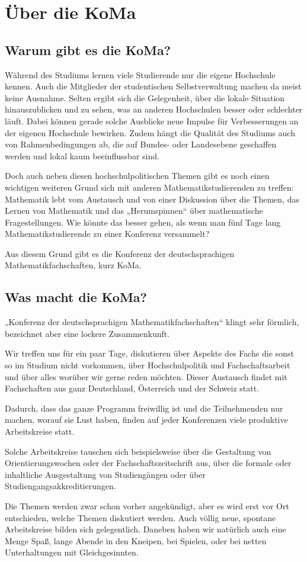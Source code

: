 \chapter{Über die KoMa}

\section{Warum gibt es die KoMa?}

Während des Studiums lernen viele Studierende nur die eigene Hochschule kennen.
Auch die Mitglieder der studentischen Selbstverwaltung machen da meist keine Ausnahme.
Selten ergibt sich die Gelegenheit, über die lokale Situation hinauszublicken und zu sehen, was an anderen Hochschulen besser oder schlechter läuft.
Dabei können gerade solche Ausblicke neue Impulse für Verbesserungen an der eigenen Hochschule bewirken.
Zudem hängt die Qualität des Studiums auch von Rahmenbedingungen ab, die auf Bundes- oder Landesebene geschaffen werden und lokal kaum beeinflussbar sind.

Doch auch neben diesen hochschulpolitischen Themen gibt es noch einen
wichtigen weiteren Grund sich mit anderen Mathematikstudierenden zu treffen:
Mathematik lebt vom Austausch und von einer Diskussion über
die Themen, das Lernen von Mathematik und das „Herumspinnen“ über mathematische
Fragestellungen. Wie könnte das besser gehen, als wenn man fünf Tage lang Mathematikstudierende zu einer Konferenz versammelt?

Aus diesem Grund gibt es die Konferenz der deutschsprachigen Mathematikfachschaften, kurz KoMa.


\section{Was macht die KoMa?}
„Konferenz der deutschsprachigen Mathematikfachschaften“ klingt sehr förmlich, bezeichnet aber eine lockere Zusammenkunft.

Wir treffen uns für ein paar Tage, diskutieren über Aspekte des Fachs die sonst so im Studium nicht vorkommen,
über Hochschulpolitik und Fachschaftsarbeit und über alles worüber wir gerne reden möchten.
Dieser Austausch findet mit Fachschaften aus ganz Deutschland, Österreich und der Schweiz statt.

Dadurch, dass das ganze Programm freiwillig ist und die Teilnehmenden nur machen, worauf sie Lust haben,
finden auf jeder Konferenzen viele produktive Arbeitskreise statt.

Solche Arbeitskreise tauschen sich beispielsweise über die Gestaltung von Orientierungswochen oder der Fachschaftszeitschrift aus,
über die formale oder inhaltliche Ausgestaltung von Studiengängen oder über Studiengangsakkreditierungen.

Die Themen werden zwar schon vorher angekündigt, aber es wird erst vor Ort entschieden, welche Themen diskutiert werden.
Auch völlig neue, spontane Arbeitskreise bilden sich gelegentlich.
Daneben haben wir natürlich auch eine Menge Spaß,
lange Abende in den Kneipen, bei Spielen,
oder bei netten Unterhaltungen mit Gleichgesinnten.